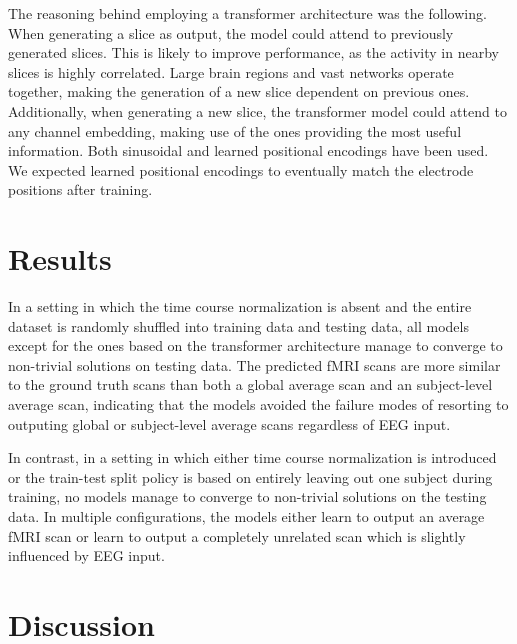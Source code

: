 \documentclass{article}
\begin{document}
The reasoning behind employing a transformer architecture was the following. When generating a slice as output, the model could attend to previously generated slices. This is likely to improve performance, as the activity in nearby slices is highly correlated. Large brain regions and vast networks operate together, making the generation of a new slice dependent on previous ones. Additionally, when generating a new slice, the transformer model could attend to any channel embedding, making use of the ones providing the most useful information. Both sinusoidal and learned positional encodings have been used. We expected learned positional encodings to eventually match the electrode positions after training.

\section{Results}

In a setting in which the time course normalization is absent and the entire dataset is randomly shuffled into training data and testing data, all models except for the ones based on the transformer architecture manage to converge to non-trivial solutions on testing data. The predicted fMRI scans are more similar to the ground truth scans than both a global average scan and an subject-level  average scan, indicating that the models avoided the failure modes of resorting to outputing global or subject-level average scans regardless of EEG input.

In contrast, in a setting in which either time course normalization is introduced or the train-test split policy is based on entirely leaving out one subject during training, no models manage to converge to non-trivial solutions on the testing data. In multiple configurations, the models either learn to output an average fMRI scan or learn to output a completely unrelated scan which is slightly influenced by EEG input.

\section{Discussion}
\end{document}
